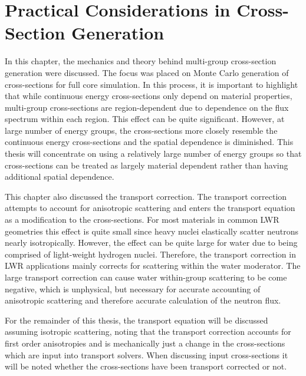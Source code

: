 \section{Practical Considerations in Cross-Section Generation}
\label{sec:mgxs-implications}

In this chapter, the mechanics and theory behind multi-group cross-section generation were discussed. The focus was placed on Monte Carlo generation of cross-sections for full core simulation. In this process, it is important to highlight that while continuous energy cross-sections only depend on material properties, multi-group cross-sections are region-dependent due to dependence on the flux spectrum within each region. This effect can be quite significant. However, at large number of energy groups, the cross-sections more closely resemble the continuous energy cross-sections and the spatial dependence is diminished. This thesis will concentrate on using a relatively large number of energy groups so that cross-sections can be treated as largely material dependent rather than having additional spatial dependence.

This chapter also discussed the transport correction. The transport correction attempts to account for anisotropic scattering and enters the transport equation as a modification to the cross-sections. For most materials in common LWR geometries this effect is quite small since heavy nuclei elastically scatter neutrons nearly isotropically. However, the effect can be quite large for water due to being comprised of light-weight hydrogen nuclei. Therefore, the transport correction in LWR applications mainly corrects for scattering within the water moderator. The large transport correction can cause water within-group scattering to be come negative, which is unphysical, but necessary for accurate accounting of anisotropic scattering and therefore accurate calculation of the neutron flux.

For the remainder of this thesis, the transport equation will be discussed assuming isotropic scattering, noting that the transport correction accounts for first order anisotropies and is mechanically just a change in the cross-sections which are input into transport solvers. When discussing input cross-sections it will be noted whether the cross-sections have been transport corrected or not.

